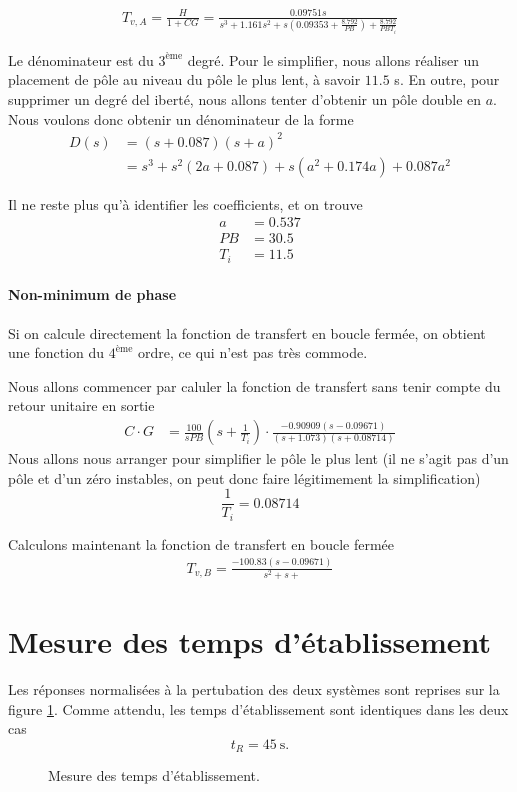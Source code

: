 \documentclass[frenchb, paper=a4, fontsize=11pt]{scrartcl}
\numberwithin{equation}{section}					%
\numberwithin{figure}{section}					%
\numberwithin{table}{section}						%
\begin{document}
\begin{align*}
T_{v,A}= \frac{H}{1+CG}= \frac{0.09751s}{s^3+1.161 s^2 + s(0.09353 + \frac{8.792}{PB}) + \frac{8.792}{PB T_i}}
\end{align*}

Le dénominateur est du $3^{\text{ème}}$ degré. Pour le simplifier, nous allons réaliser un placement de pôle au niveau du pôle le plus lent, à savoir $11.5$ s. En outre, pour supprimer un degré del iberté, nous allons tenter d'obtenir un pôle double en $a$.
Nous voulons donc obtenir un dénominateur de la forme
\begin{align*}
D(s) &= (s+0.087)(s+a)^2\\
&= s^3 + s^2 (2a+0.087) + s(a^2 + 0.174a) + 0.087a^2
\end{align*}

Il ne reste plus qu'à identifier les coefficients, et on trouve
\begin{align*}
a&=0.537\\
PB&=30.5\\
T_i &= 11.5
\end{align*}

\paragraph{Non-minimum de phase}

Si on calcule directement la fonction de transfert en boucle fermée, on obtient une fonction du $4^{\text{ème}}$ ordre, ce qui n'est pas très commode.

Nous allons commencer par caluler la fonction de transfert sans tenir compte du retour unitaire en sortie
\begin{align*}
C\cdot G &= \frac{100}{s PB}(s+\frac{1}{T_i}) \cdot \frac{-0.90909(s-0.09671)}{(s+1.073)(s+0.08714)}
\end{align*} 
Nous allons nous arranger pour simplifier le pôle le plus lent (il ne s'agit pas d'un pôle et d'un zéro instables, on peut donc faire légitimement la simplification) 
\begin{equation}
\frac{1}{T_i} = 0.08714
\end{equation}


Calculons maintenant la fonction de transfert en boucle fermée
\begin{align*}
T_{v,B} = \frac{-100.83(s-0.09671)}{s^2 + s + }
\end{align*}


\section{Mesure des temps d'établissement}
Les réponses normalisées à la pertubation des deux systèmes sont
reprises sur la figure \ref{fig:settling-time}. Comme attendu,
les temps d'établissement sont identiques dans les deux cas
\begin{equation}
	t_R = \SI{45}{\second}.
\end{equation}

\begin{figure}[ht]
	\centering
	
	\caption{Mesure des temps d'établissement.}
	\label{fig:settling-time}
\end{figure}
\end{document}
